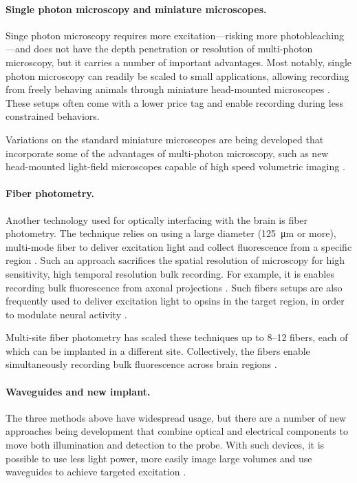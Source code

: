 \paragraph{Single photon microscopy and miniature microscopes.}
Singe photon microscopy requires more excitation---risking more
photobleaching---and does not have the depth penetration or 
resolution of multi-photon microscopy, but it carries a number 
of important advantages. Most notably, single photon microscopy 
can readily be scaled to small applications, allowing recording 
from freely behaving animals through miniature head-mounted 
microscopes \cite{Ghosh:2011ee,Cai:2016hm,LibertiIII:2017df}.
These setups often come with a lower price tag and enable 
recording during less constrained behaviors.

Variations on the standard miniature microscopes are being 
developed that incorporate some of the advantages of multi-photon
microscopy, such as new head-mounted light-field microscopes 
capable of high speed volumetric imaging \cite{Skocek:2018hs}.

\paragraph{Fiber photometry.} Another technology used 
for optically interfacing with the brain is fiber photometry. 
The technique relies on using a large diameter 
(125~\si{\micro\meter} or more), multi-mode fiber to 
deliver excitation light and collect fluorescence from a 
specific region 
\cite{Adelsberger:2005dy,Cui:2013dq,Adelsberger:2014jd}.
Such an approach sacrifices the spatial resolution of 
microscopy for high sensitivity, high temporal resolution 
bulk recording. For example, it is enables recording bulk 
fluorescence from axonal projections \cite{Gunaydin:2014dh}. 
Such fibers setups are also frequently used to deliver 
excitation light to opsins in the target region, in order
to modulate neural activity \cite{Warden:2014bx}.

Multi-site fiber photometry has scaled these techniques up to 
8--12 fibers, each of which can be implanted in a different site.
Collectively, the fibers enable simultaneously recording bulk 
fluorescence across brain regions \cite{Guo:2015gu}.

\paragraph{Waveguides and new implant.} The three methods 
above have widespread usage, but there are a number of new 
approaches being development that combine optical and electrical 
components to move both illumination and detection to the probe.
With such devices, it is possible to use less light power, 
more easily image large volumes and use waveguides to achieve 
targeted excitation \cite{Warden:2014bx,Wu:2015gk,Segev:2017en}.

